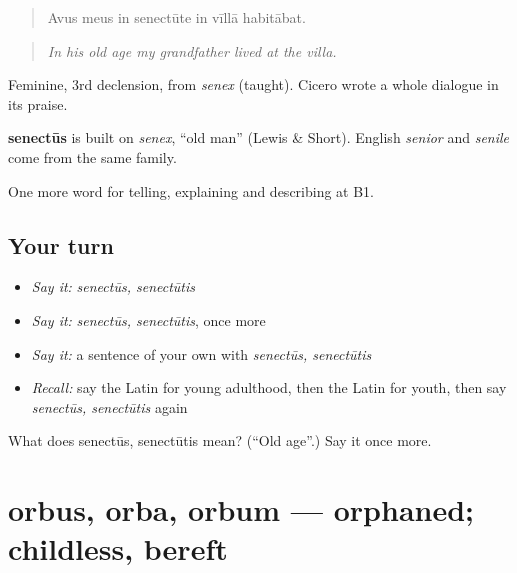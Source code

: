 \begin{quote}
Avus meus in senectūte in vīllā habitābat.
\end{quote}

\begin{quote}
\emph{In his old age my grandfather lived at the villa.}
\end{quote}

Feminine, 3rd declension, from \emph{senex} (taught). Cicero wrote a whole dialogue in its praise.

\begin{cousinweb}
\textbf{senectūs} is built on \emph{senex}, \textquotedblleft{}old man\textquotedblright{} (Lewis \& Short). English \emph{senior} and \emph{senile} come from the same family.
\end{cousinweb}

\begin{grammarlens}[title={What you've built}]
One more word for telling, explaining and describing at B1.
\end{grammarlens}

\subsection*{Your turn}
\begin{itemize}
\raggedright
  \item \emph{Say it:} \emph{senectūs, senectūtis}
  \item \emph{Say it:} \emph{senectūs, senectūtis}, once more
  \item \emph{Say it:} a sentence of your own with \emph{senectūs, senectūtis}
  \item \emph{Recall:} say the Latin for young adulthood, then the Latin for youth, then say \emph{senectūs, senectūtis} again
\end{itemize}

\begin{tcolorbox}[breakable,colback=teal!4,colframe=teal!35!black,title={Before you move on}]
What does senectūs, senectūtis mean? (\textquotedblleft{}Old age\textquotedblright{}.) Say it once more.
\end{tcolorbox}
\section[orbus, orba, orbum]{orbus, orba, orbum — orphaned; childless, bereft}

\label{lesson:LA-C326-orbus}



